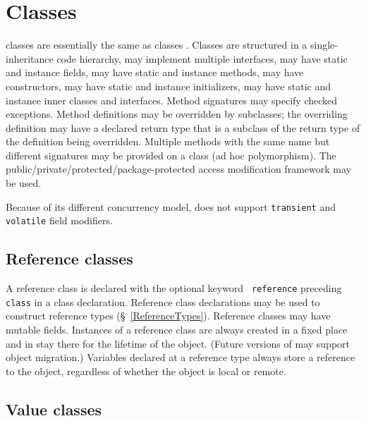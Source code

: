 \chapter{Classes}
\label{XtenClasses}

{}\Xten{} classes are essentially the same as \java{} classes \cite[\S 8]{jls2}. Classes
are structured in a single-inheritance code hierarchy, may implement
multiple interfaces, may have static and instance fields, may have
static and instance methods, may have constructors, may have static
and instance initializers, may have static and instance inner classes
and interfaces. Method signatures may specify checked
exceptions. Method definitions may be overridden by subclasses; the
overriding definition may have a declared return type that is a
subclass of the return type of the definition being
overridden. Multiple methods with the same name but different
signatures may be provided on a class (ad hoc polymorphism). The
public/private/protected/package-protected access modification
framework may be used.


Because of its different concurrency model, \Xten{} does not support
{\tt transient} and {\tt volatile} field modifiers.


\section{Reference classes}\label{ReferenceClasses}

A reference class is declared with the optional keyword {\tt
reference} preceding {\tt class} in a class declaration. Reference
class declarations may be used to construct reference types
(\S~\ref{ReferenceTypes}). Reference classes may have mutable
fields. Instances of a reference class are always created in a fixed
place and in \XtenCurrVer{} stay there for the lifetime of the
object. (Future versions of \Xten{} may support object migration.)
Variables declared at a reference type always store a reference to the
object, regardless of whether the object is local or remote.


\section{Value classes}\label{ValueClasses}


